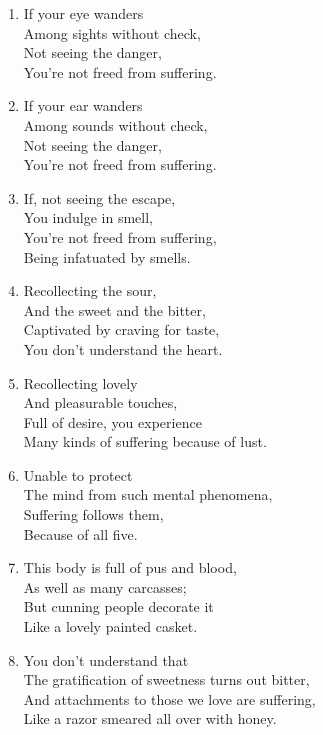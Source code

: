 \documentclass[10pt, openany]{book}
\begin{document}
\begin{enumerate}
\item If your eye wanders\\
Among sights without check,\\
Not seeing the danger,\\
You’re not freed from suffering.

\item If your ear wanders\\
Among sounds without check,\\
Not seeing the danger,\\
You’re not freed from suffering.

\item If, not seeing the escape,\\
You indulge in smell,\\
You’re not freed from suffering,\\
Being infatuated by smells.

\item Recollecting the sour,\\
And the sweet and the bitter,\\
Captivated by craving for taste,\\
You don’t understand the heart.

\item Recollecting lovely\\
And pleasurable touches,\\
Full of desire, you experience\\
Many kinds of suffering because of lust.

\item Unable to protect\\
The mind from such mental phenomena,\\
Suffering follows them,\\
Because of all five.

\item This body is full of pus and blood,\\
As well as many carcasses;\\
But cunning people decorate it\\
Like a lovely painted casket.

\item You don’t understand that\\
The gratification of sweetness turns out bitter,\\
And attachments to those we love are suffering,\\
Like a razor smeared all over with honey.


\end{enumerate}
\end{document}
